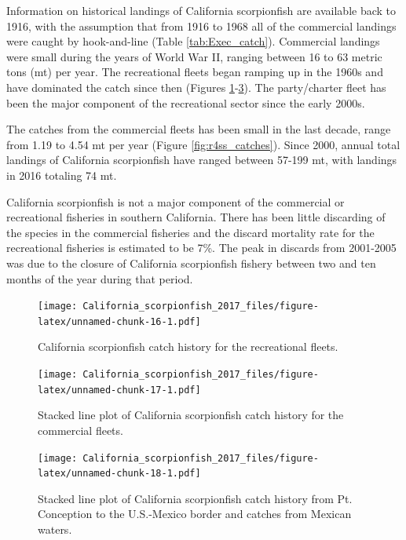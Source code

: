 \documentclass[12pt,]{article}
\begin{document}
Information on historical landings of California scorpionfish are
available back to 1916, with the assumption that from 1916 to 1968 all
of the commercial landings were caught by hook-and-line (Table
\ref{tab:Exec_catch}). Commercial landings were small during the years
of World War II, ranging between 16 to 63 metric tons (mt) per year. The
recreational fleets began ramping up in the 1960s and have dominated the
catch since then (Figures \ref{fig:Exec_catch1}-\ref{fig:Exec_catch3}).
The party/charter fleet has been the major component of the recreational
sector since the early 2000s.

The catches from the commercial fleets has been small in the last
decade, range from 1.19 to 4.54 mt per year (Figure
\ref{fig:r4ss_catches}). Since 2000, annual total landings of California
scorpionfish have ranged between 57-199 mt, with landings in 2016
totaling 74 mt.

California scorpionfish is not a major component of the commercial or
recreational fisheries in southern California. There has been little
discarding of the species in the commercial fisheries and the discard
mortality rate for the recreational fisheries is estimated to be 7\%.
The peak in discards from 2001-2005 was due to the closure of California
scorpionfish fishery between two and ten months of the year during that
period.

\FloatBarrier

\begin{figure}[htbp]
\centering
\texttt{[image: California\_scorpionfish\_2017\_files/figure-latex/unnamed-chunk-16-1.pdf]}
\caption{California scorpionfish catch history for the recreational
fleets. \label{fig:Exec_catch1}}
\end{figure}

\begin{figure}[htbp]
\centering
\texttt{[image: California\_scorpionfish\_2017\_files/figure-latex/unnamed-chunk-17-1.pdf]}
\caption{Stacked line plot of California scorpionfish catch history for
the commercial fleets. \label{fig:Exec_catch2}}
\end{figure}

\begin{figure}[htbp]
\centering
\texttt{[image: California\_scorpionfish\_2017\_files/figure-latex/unnamed-chunk-18-1.pdf]}
\caption{Stacked line plot of California scorpionfish catch history from
Pt. Conception to the U.S.-Mexico border and catches from Mexican
waters. \label{fig:Exec_catch3}}
\end{figure}
\end{document}

